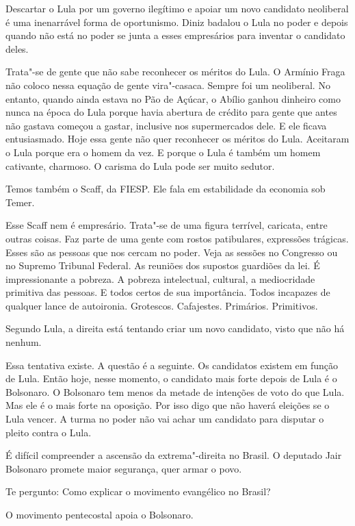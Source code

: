 \falaG Descartar o Lula por um governo ilegítimo e apoiar um novo candidato
neoliberal é uma inenarrável forma de oportunismo. Diniz badalou o Lula
no poder e depois quando não está no poder se junta a esses empresários
para inventar o candidato deles.

\falaM Trata"-se de gente que não sabe reconhecer os méritos do Lula. O
Armínio Fraga não coloco nessa equação de gente vira"-casaca. Sempre foi
um neoliberal. No entanto, quando ainda estava no Pão de Açúcar, o
Abílio ganhou dinheiro como nunca na época do Lula porque havia abertura
de crédito para gente que antes não gastava começou a gastar, inclusive
nos supermercados dele. E ele ficava entusiasmado. Hoje essa gente não
quer reconhecer os méritos do Lula. Aceitaram o Lula porque era o homem
da vez. E porque o Lula é também um homem cativante, charmoso. O carisma
do Lula pode ser muito sedutor.

\falaG Temos também o Scaff, da FIESP. Ele fala em estabilidade da economia
sob Temer.

\falaM Esse Scaff nem é empresário. Trata"-se de uma figura terrível,
caricata, entre outras coisas. Faz parte de uma gente com rostos
patibulares, expressões trágicas. Esses são as pessoas que nos cercam no
poder. Veja as sessões no Congresso ou no Supremo Tribunal Federal. As
reuniões dos supostos guardiões da lei. É impressionante a pobreza. A
pobreza intelectual, cultural, a mediocridade primitiva das pessoas. E
todos certos de sua importância. Todos incapazes de qualquer lance de
autoironia. Grotescos. Cafajestes. Primários. Primitivos.

\falaG Segundo Lula, a direita está tentando criar um novo candidato, visto
que não há nenhum.

\falaM Essa tentativa existe. A questão é a seguinte. Os candidatos existem
em função de Lula. Então hoje, nesse momento, o candidato mais forte
depois de Lula é o Bolsonaro. O Bolsonaro tem menos da metade de
intenções de voto do que Lula. Mas ele é o mais forte na oposição. Por
isso digo que não haverá eleições se o Lula vencer. A turma no poder não
vai achar um candidato para disputar o pleito contra o Lula.

\falaG É difícil compreender a ascensão da extrema"-direita no Brasil. O
deputado Jair Bolsonaro promete maior segurança, quer armar o povo.

\falaM Te pergunto: Como explicar o movimento evangélico no Brasil?

\falaG O movimento pentecostal apoia o Bolsonaro.

